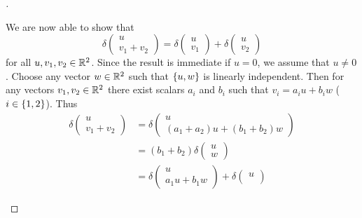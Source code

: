 \begin{proof}[]
\begin{enumerate}
		      We are now able to show that
		      \[
			      \delta\begin{pmatrix}
				      u \\
				      v_1 + v_2
			      \end{pmatrix} = \delta\begin{pmatrix}
				      u \\
				      v_1
			      \end{pmatrix} + \delta\begin{pmatrix}
				      u \\
				      v_2
			      \end{pmatrix}
		      \]
		      for all \(u, v_1, v_2 \in \mathbb{R}^2\).
		      Since the result is immediate if \(u = 0\), we assume that \(u \neq 0\).
		      Choose any vector \(w \in \mathbb{R}^2\) such that \(\left\lbrace u, w\right\rbrace\) is linearly independent.
		      Then for any vectors \(v_1, v_2 \in \mathbb{R}^2\) there exist scalars \(a_i\) and \(b_i\) such that \(v_i = a_i u + b_i w\) (\(i \in \left\lbrace1, 2\right\rbrace\)).
		      Thus
		      \begin{align*}
			      \delta\begin{pmatrix}
				            u \\
				            v_1 + v_2
			            \end{pmatrix} & = \delta\begin{pmatrix}
				                                    u \\
				                                    (a_1 + a_2) u + (b_1 + b_2) w
			                                    \end{pmatrix}           \\
			                            & = (b_1 + b_2) \delta\begin{pmatrix}
				                                                  u \\
				                                                  w
			                                                  \end{pmatrix}           \\
			                            & = \delta\begin{pmatrix}
				                                      u \\
				                                      a_1 u + b_1 w
			                                      \end{pmatrix} + \delta\begin{pmatrix}
				                                                            u \\

\end{pmatrix}
\end{align*}
\end{enumerate}
\end{proof}
